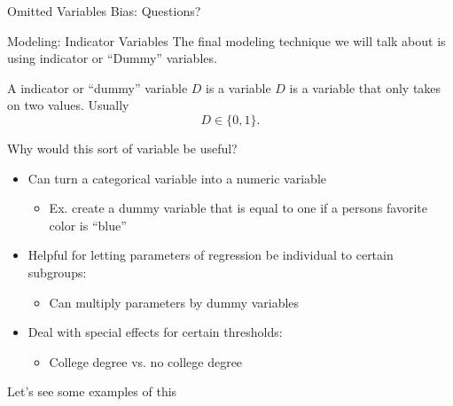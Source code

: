 \documentclass[notheorems, 9pt, handout]{beamer}
\begin{document}
\begin{frame}{Omitted Variables Bias: Questions?} %
	\label{frame:questions-ovb} %
	\centering
\end{frame}
\begin{frame}{Modeling: Indicator Variables} %
	\label{frame:indicator} %
	The final modeling technique we will talk about is using indicator or ``Dummy'' variables.

	\begin{definition}
		\label{def:dummy}
		A indicator or ``dummy'' variable \(D\) is a variable \(D\) is a variable that only takes on two values. Usually
		 \[
		    D \in \{0,1\} 
		.\] 
	\end{definition}
	 Why would this sort of variable be useful?
	\begin{itemize}
		\item Can turn a categorical variable into a numeric variable
		\begin{itemize}
			\item Ex. create a dummy variable that is equal to one if a persons favorite color is ``blue''
		\end{itemize}
		\item Helpful for letting parameters of regression be individual to certain subgroups:
		\begin{itemize}
			\item Can multiply parameters by dummy variables
		\end{itemize}
		\item Deal with special effects for certain thresholds:
		\begin{itemize}
			\item College degree vs. no college degree
		\end{itemize}
	\end{itemize}
	Let's see some examples of this
\end{frame}
\end{document}

